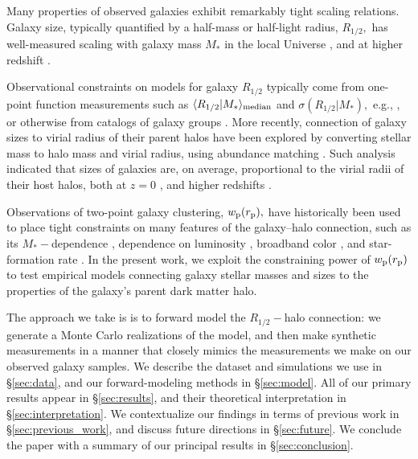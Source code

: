 \documentclass[usenatbib,usegraphicx,letterpaper]{mn2e}
\newcommand{\rhalf}{R_{1/2}}
\newcommand{\mstar}{M_{\ast}}
\newcommand{\rproj}{r_{\rm p}}
\newcommand{\wproj}{w_{\rm p}}
\newcommand{\median}[2]{\langle{#1}\vert{#2}\rangle_{\rm median}}
\begin{document}
Many properties of observed galaxies exhibit remarkably tight scaling relations. Galaxy size, typically quantified by a half-mass or half-light radius, $\rhalf,$ has well-measured scaling with galaxy mass $\mstar$ in the local Universe \citep{shen_etal03,guo_etal09,huang_etal13,lange_etal15,zhang_yang17}, and at higher redshift \citep{trujillo_etal04,vanderwel_etal14,kawamata_etal15,shibuya_etal15,huertas_company_etal13a,huang_etal17}.

Observational constraints on models for galaxy $\rhalf$ typically come from one-point function measurements such as $\median{\rhalf}{\mstar}$ and $\sigma(\rhalf\vert\mstar),$ e.g.,  \citet{khochfar_silk06,desmond_etal17,bottrell_etal17b,hou_etal17,somerville_etal17}, or otherwise from catalogs of galaxy groups \citep{weinmann_etal08,huertas_company_etal13b,spindler_wake17}. More recently, connection of galaxy sizes to virial radius of their parent halos have been
explored by converting stellar mass to halo mass and virial radius, using abundance matching \citep{kravtsov_etal04,tasitsiomi_etal04,vale_ostriker04,vale_ostriker06,conroy_etal06}.  Such analysis indicated that sizes of galaxies
are, on average, proportional to the virial radii of their host halos, both at $z=0$ \citep{kravtsov13}, and higher redshifts \citep{huang_etal17,somerville_etal17}.

Observations of two-point galaxy clustering, $\wproj(\rproj),$ have historically been used to place tight constraints on many features of the galaxy--halo connection, such as its $\mstar-$dependence \citep{moster_etal10,leauthaud_etal11,reddick_etal13,skibba_etal15}, dependence on luminosity \citep{kravtsov_etal04, tasitsiomi_etal04,vale_ostriker04,vale_ostriker06,tinker_etal05,cacciato_etal13}, broadband color \citep{coil_etal08,zehavi_etal11,guo_etal11,hearin_watson13}, and star-formation rate \citep{wang_etal07,tinker_etal13,watson_etal14}. In the present work, we exploit the constraining power of $\wproj(\rproj)$ to test empirical models connecting galaxy stellar masses and sizes to the properties of the galaxy's parent dark matter halo.

The approach we take is is to forward model the $\rhalf-$halo connection: we generate a Monte Carlo realizations of the model, and then make synthetic measurements in a manner that closely mimics the measurements we make on our observed galaxy samples. We describe the dataset and simulations we use in \S\ref{sec:data}, and our forward-modeling methods in \S\ref{sec:model}. All of our primary results appear in \S\ref{sec:results}, and their theoretical interpretation in \S\ref{sec:interpretation}. We contextualize our findings in terms of previous work in \S\ref{sec:previous_work}, and discuss future directions in \S\ref{sec:future}. We conclude the paper with a summary of our principal results in \S\ref{sec:conclusion}.
\end{document}
